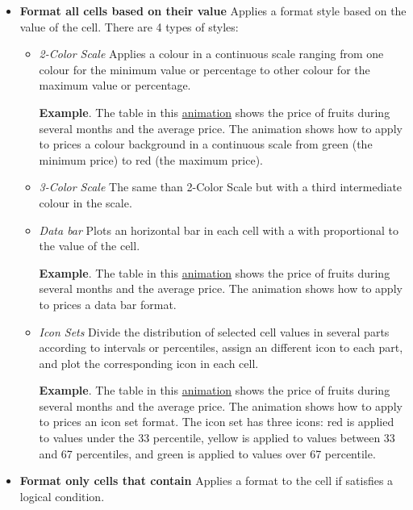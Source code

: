 \begin{itemize}
\item \textbf{Format all cells based on their value} Applies a format style based on the value of the cell. There are 4 types of styles:


\begin{itemize}
\item \emph{2-Color Scale} Applies a colour in a continuous scale ranging from one colour for the minimum value or percentage to other colour for the maximum value or percentage.

\textbf{Example}. The table in this \href{http://aprendeconalf.es/office/excel/manual/img/example_conditional_formatting_colour_scale.gif}{animation} shows the price of fruits during several months and the average price. The animation shows how to apply to prices a colour background in a continuous scale from green (the minimum price) to red (the maximum price).
\item \emph{3-Color Scale} The same than 2-Color Scale but with a third intermediate colour in the scale.
\item \emph{Data bar} Plots an horizontal bar in each cell with a with proportional to the value of the cell.

\textbf{Example}. The table in this \href{http://aprendeconalf.es/office/excel/manual/img/example_conditional_formatting_data_bar.gif}{animation} shows the price of fruits during several months and the average price. The animation shows how to apply to prices a data bar format.
\item \emph{Icon Sets} Divide the distribution of selected cell values in several parts according to intervals or percentiles, assign an different icon to each part, and plot the corresponding icon in each cell.

\textbf{Example}. The table in this \href{http://aprendeconalf.es/office/excel/manual/img/example_conditional_formatting_icon_set.gif}{animation} shows the price of fruits during several months and the average price. The animation shows how to apply to prices an icon set format. The icon set has three icons: red is applied to values under the 33 percentile, yellow is applied to values between 33 and 67 percentiles, and green is applied to values over 67 percentile.
\end{itemize}
\item \textbf{Format only cells that contain} Applies a format to the cell if satisfies a logical condition.
\end{itemize}

